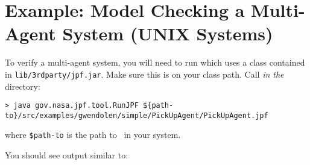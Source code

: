 \section{Example: Model Checking a Multi-Agent System (UNIX Systems)}

To verify a multi-agent system, you will need to run \jpf which uses a class contained in \texttt{lib/3rdparty/jpf.jar}.  Make sure this is on your class path.  Call \emph{in the \ajpfversion} directory:

\noindent \begin{lstlisting}[basicstyle=\tiny]
> java gov.nasa.jpf.tool.RunJPF ${path-to}/src/examples/gwendolen/simple/PickUpAgent/PickUpAgent.jpf
\end{lstlisting}
\medskip

\noindent where \texttt{\${path-to}} is the path to \ajpfversion\ in your system.

You should see output similar to: 

